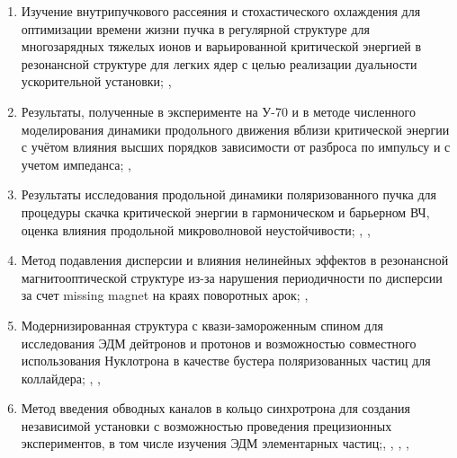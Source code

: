 \par {}
\begin{enumerate}[beginpenalty=10000] %
  \item 	Изучение внутрипучкового рассеяния и стохастического охлаждения для оптимизации времени жизни пучка в регулярной структуре для многозарядных тяжелых ионов и варьированной критической энергией в резонансной структуре для легких ядер с целью реализации дуальности ускорительной установки; \cite{Kolokolchikov:2025_dual}, \cite{Syresin:2021_polar}
  \item	Результаты, полученные в эксперименте на У-70 и в методе численного моделирования динамики продольного движения вблизи критической энергии с учётом влияния высших порядков зависимости от разброса по импульсу и с учетом импеданса; \cite{Kolokolchikov:2025_U70}, \cite{Kolokolchikov:2025_jump}
  \item	Результаты исследования продольной динамики поляризованного пучка для процедуры скачка критической энергии в гармоническом и барьерном ВЧ, оценка влияния продольной микроволновой неустойчивости; \cite{Kolokolchikov:2024_bb_rupac}, \cite{Kolokolchikov:2023_bb_IPAC}, \cite{Kolokolchikov:2024_bb_dspin}
  \item	Метод подавления дисперсии и влияния нелинейных эффектов в резонансной магнитооптической структуре из-за нарушения периодичности по дисперсии за счет missing magnet на краях поворотных арок; \cite{Kolokolchikov:2021trans}, \cite{Kolokolchikov:2023_pecular}
  \item	Модернизированная структура с квази-замороженным спином для исследования ЭДМ дейтронов и протонов и возможностью совместного использования Нуклотрона в качестве бустера поляризованных частиц для коллайдера; \cite{Senichev:2023_QFS}, \cite{Senichev:2023_nuclotron}, \cite{Kolokolchikov:2025_nuclotron}
  \item	Метод введения обводных каналов в кольцо синхротрона для создания независимой установки с возможностью проведения прецизионных экспериментов, в том числе изучения ЭДМ элементарных частиц;\cite{Kolokolchikov:2023_bypass}, \cite{Kolokolchikov:2023_bypass_IPAC}, \cite{Senichev:2024_nica_edm}, \cite{Kolokolchikov:2023_sc}, \cite{Kolokolchikov:2023_sc_IPAC}
\end{enumerate}

